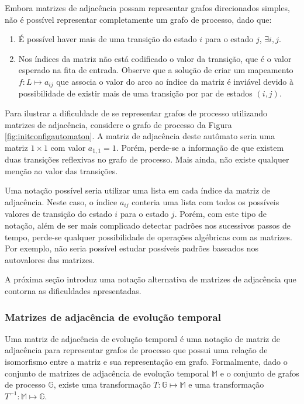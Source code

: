 \documentclass[12pt,a4paper]{article}
\begin{document}
Embora matrizes de adjacência possam representar grafos direcionados simples,
não é possível representar completamente um grafo de processo, dado que:

\begin{enumerate}
\item É possível haver mais de uma transição do estado $i$ para o estado
$j$, $\exists i,j$.

\item Nos índices da matriz não está codificado o valor da transição, que
é o valor esperado na fita de entrada. Observe que a solução de criar
um mapeamento $f: L \mapsto a_{ij}$ que associa o valor do arco ao índice
da matriz é inviável devido à possibilidade de existir mais de uma
transição por par de estados $(i,j)$.
\end{enumerate}

Para ilustrar a dificuldade de se representar grafos de processo utilizando
matrizes de adjacência, considere o grafo de processo da Figura
\ref{fig:initconfigautomaton}. A matriz de adjacência deste autômato
seria uma matriz $1 \times 1$ com valor $a_{1,1}=1$. Porém, perde-se a informação
de que existem duas transições reflexivas no grafo de processo. Mais ainda,
não existe qualquer menção ao valor das transições.

Uma notação possível seria utilizar uma lista em cada índice da matriz de
adjacência. Neste caso, o índice $a_{ij}$ conteria uma lista com todos
os possíveis valores de transição do estado $i$ para o estado $j$.
Porém, com este tipo de notação, além de ser mais complicado
detectar padrões nos sucessivos passos de tempo, perde-se qualquer possibilidade
de operações algébricas com as matrizes. Por exemplo, não seria possível
estudar possíveis padrões baseados nos autovalores das matrizes.

A próxima seção introduz uma notação alternativa de matrizes de
adjacência que contorna as dificuldades apresentadas.

\subsubsection{Matrizes de adjacência de evolução temporal}

Uma matriz de adjacência de evolução temporal é uma notação de matriz de
adjacência para representar grafos de processo que possui uma relação
de isomorfismo entre a matriz e sua representação em grafo.
Formalmente, dado o conjunto de matrizes de adjacência
de evolução temporal $\mathbb{M}$ e o conjunto de grafos de processo $\mathbb{G}$,
existe uma transformação $T: \mathbb{G} \mapsto \mathbb{M}$ e uma
transformação $T^{-1}: \mathbb{M} \mapsto \mathbb{G}$. 
\end{document}
